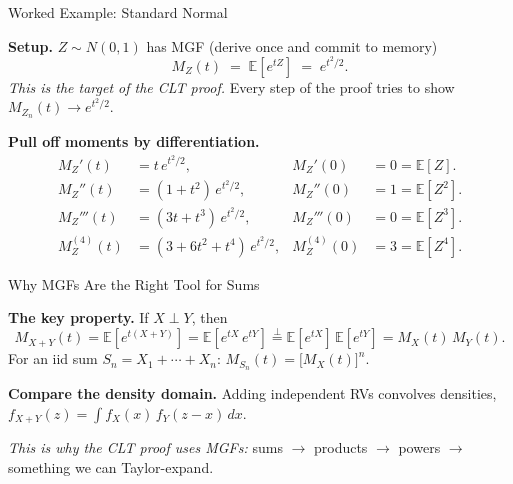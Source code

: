\documentclass[aspectratio=169, handout, t]{beamer}
\numberwithin{equation}{section}
\begin{document}

\begin{frame}{Worked Example: Standard Normal}

\textbf{Setup.} $Z \sim N(0,1)$ has MGF (derive once and commit to memory)
\[
M_Z(t) \;=\; \mathbb{E}[e^{tZ}] \;=\; e^{t^2/2}.
\]
\emph{This is the target of the CLT proof.} Every step of the proof tries to show $M_{Z_n}(t) \to e^{t^2/2}$.

\pause

\medskip

\textbf{Pull off moments by differentiation.}
\begin{align*}
M_Z'(t) &= t\,e^{t^2/2}, & M_Z'(0) &= 0 = \mathbb{E}[Z]. \\
M_Z''(t) &= (1 + t^2)\,e^{t^2/2}, & M_Z''(0) &= 1 = \mathbb{E}[Z^2]. \\
M_Z'''(t) &= (3t + t^3)\,e^{t^2/2}, & M_Z'''(0) &= 0 = \mathbb{E}[Z^3]. \\
M_Z^{(4)}(t) &= (3 + 6t^2 + t^4)\,e^{t^2/2}, & M_Z^{(4)}(0) &= 3 = \mathbb{E}[Z^4].
\end{align*}

\end{frame}


\begin{frame}{Why MGFs Are the Right Tool for Sums}

\textbf{The key property.} If $X \perp Y$, then
\[
M_{X+Y}(t) = \mathbb{E}[e^{t(X+Y)}] = \mathbb{E}[e^{tX}\,e^{tY}]
\stackrel{\perp}{=} \mathbb{E}[e^{tX}]\,\mathbb{E}[e^{tY}]
= M_X(t)\,M_Y(t).
\]
For an iid sum $S_n = X_1 + \cdots + X_n$: \quad $M_{S_n}(t) = \bigl[M_X(t)\bigr]^n.$

\pause

\medskip

\textbf{Compare the density domain.} Adding independent RVs convolves densities, $f_{X+Y}(z) = \int f_X(x)\,f_Y(z-x)\,dx$.

\pause

\medskip

\emph{This is why the CLT proof uses MGFs:} sums $\to$ products $\to$ powers $\to$ something we can Taylor-expand.

\end{frame}

\end{document}
